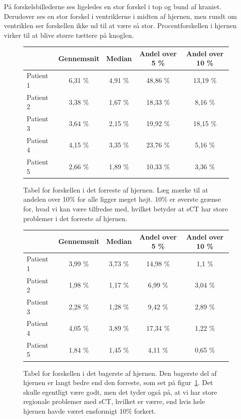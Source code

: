 På forskelsbillederne ses ligeledes en stor forskel i top og bund af
kraniet. Derudover ses en stor forskel i ventriklerne i midten af
hjernen, men rundt om ventriklen ser forskellen ikke ud til at være så
stor. Procentforskellen i hjernen virker til at blive større tættere
på knoglen.


\begin{figure}
    \centering
    \begin{tabular}{| l | c | c | c | c |}
        \hline
         & Gennemsnit & Median & Andel over 5 \% & Andel over 10 \% \\ \hline
        Patient 1 & 6,31 \% & 4,91 \% & 48,86 \% & 13,19 \% \\ \hline
        Patient 2 & 3,38 \% & 1,67 \% & 18,33 \% & 8,16 \% \\ \hline
        Patient 3 & 3,64 \% & 2,15 \% & 19,92 \% & 18,15 \% \\ \hline
        Patient 4 & 4,15 \% & 3,35 \% & 23,76 \% & 5,16 \% \\ \hline
        Patient 5 & 2,66 \% & 1,89 \% & 10,33 \% & 3,36 \% \\ \hline
    \end{tabular}
    \caption{Tabel for forskellen i det forreste af hjernen. Læg mærke til at andelen over 10\% for alle ligger meget højt. 10\% er øverste grænse for, hvad vi kan være tilfredse med, hvilket betyder at sCT har store problemer i det forreste af hjernen.}
    \label{tab:loocv_forresthjerne}
\end{figure}

\begin{figure}
    \centering
    \begin{tabular}{| l | c | c | c | c |}
        \hline
         & Gennemsnit & Median & Andel over 5 \% & Andel over 10 \% \\ \hline
        Patient 1 & 3,99 \% & 3,73 \% & 14,98 \% & 1,1 \% \\ \hline
        Patient 2 & 1,98 \% & 1,17 \% & 6,99 \% & 3,04 \% \\ \hline
        Patient 3 & 2,28 \% & 1,28 \% & 9,42 \% & 2,89 \% \\ \hline
        Patient 4 & 4,05 \% & 3,89 \% & 17,34 \% & 1,22 \% \\ \hline
        Patient 5 & 1,84 \% & 1,45 \% & 4,11 \% & 0,65 \% \\ \hline
    \end{tabular}
    \caption{Tabel for forskellen i det bagerste af hjernen. Den bagerste del af hjernen er langt bedre end den forreste, som set på figur~\ref{tab:loocv_forresthjerne}. Det skulle egentligt være godt, men det tyder også på, at vi har store regionale problemer med sCT, hvilket er værre, end hvis hele hjernen havde været ensformigt 10\% forkert.}
    \label{tab:loocv_bagersthjerne}
\end{figure}


